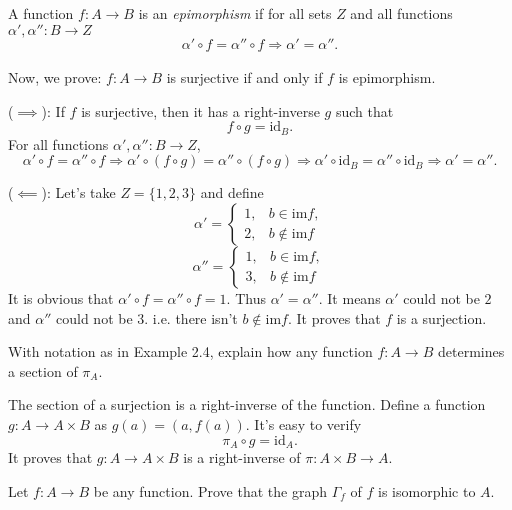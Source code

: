 \begin{solution}
 A function $f:A\to B$ is an \textit{epimorphism} if for all sets $Z$
  and all functions $\alpha',\alpha'':B\to Z$
  $$\alpha'\circ f = \alpha''\circ f\Longrightarrow \alpha' = \alpha''.$$\\
  Now, we prove: $f: A\rightarrow B$ is surjective if and only if $f$ is epimorphism.
  
  ($\implies$): If $f$ is surjective, then it has a right-inverse $g$ such that $$f\circ g = \text{id}_{B}.$$
  For all functions $\alpha',\alpha'': B\to Z$, 
  $$\alpha'\circ f = \alpha''\circ f \Longrightarrow \alpha'\circ (f\circ g) = \alpha''\circ (f\circ g) \Longrightarrow \alpha'\circ \text{id}_{B} = \alpha''\circ \text{id}_{B} \Longrightarrow \alpha' = \alpha''.$$
  
  ($\impliedby$): Let's take $Z=\{1,2,3\}$ and define 
  $$\alpha'=\begin{cases}
  			1, &b\in \text{im}f,\\
			2, &b\notin\text{im}f			
  			\end{cases}
  $$
    $$\alpha''=\begin{cases}
  			1, &b\in \text{im}f,\\
			3, &b\notin\text{im}f			
  			\end{cases}
  $$
 It is obvious that $\alpha'\circ f = \alpha''\circ f = 1$. Thus $\alpha' = \alpha''$. It means $\alpha'$ could not be $2$ and 
 $\alpha''$ could not be $3$. i.e. there isn't $b\notin \text{im}f$. It proves that $f$ is a surjection. 
\end{solution}

\begin{problem}[2.6]
  With notation as in Example 2.4, explain how any function $f:A\to B$ determines
  a section of $\pi_A$.
\end{problem}

\begin{solution}
The section of a surjection is a right-inverse of the function. Define a function $g: A\rightarrow A\times B$ as
$g(a)=(a, f(a))$.
It's easy to verify 
$$\pi_{A} \circ g =\text{id}_A.$$ It proves that $g: A\rightarrow A\times B$ is a right-inverse of $\pi: A\times B \rightarrow A$.
\end{solution}

\begin{problem}[2.7]
  Let $f:A\to B$ be any function. Prove that the graph $\Gamma_f$ of $f$ is
  isomorphic to $A$.
\end{problem}

